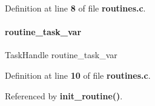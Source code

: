 Definition at line \textbf{ 8} of file \textbf{ routines.\+c}.

\mbox{\label{routines_8c_a8ac8c8354c257b390c000a5153f4fec6}} 
\paragraph{routine\+\_\+task\+\_\+var}
{\footnotesize\ttfamily Task\+Handle routine\+\_\+task\+\_\+var\hspace{0.3cm}{\ttfamily [static]}}



Definition at line \textbf{ 10} of file \textbf{ routines.\+c}.



Referenced by \textbf{ init\+\_\+routine()}.

